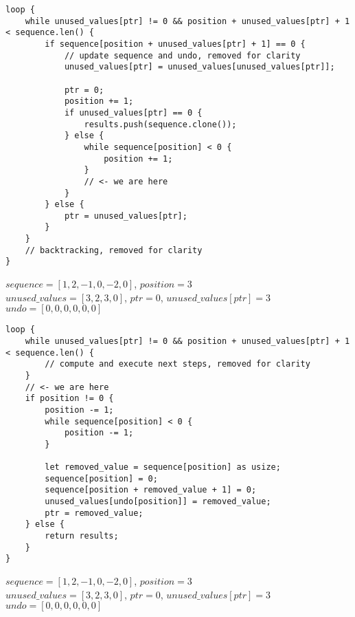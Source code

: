 \begin{frame}[fragile]
    \begin{verbatim}
loop {
    while unused_values[ptr] != 0 && position + unused_values[ptr] + 1 < sequence.len() {
        if sequence[position + unused_values[ptr] + 1] == 0 {
            // update sequence and undo, removed for clarity
            unused_values[ptr] = unused_values[unused_values[ptr]];
            
            ptr = 0;
            position += 1;
            if unused_values[ptr] == 0 {
                results.push(sequence.clone());
            } else {
                while sequence[position] < 0 {
                    position += 1;
                }
                // <- we are here
            }
        } else {
            ptr = unused_values[ptr];
        }
    }
    // backtracking, removed for clarity
}
    \end{verbatim}
    $sequence = [1, 2, -1, 0, -2, 0]$, $position = 3$\\
    $unused\_values = [3, 2, 3, 0]$, $ptr = 0$, $unused\_values[ptr] = 3$\\
    $undo = [0, 0, 0, 0, 0, 0]$
\end{frame}
\begin{frame}[fragile]
    \begin{verbatim}
loop {
    while unused_values[ptr] != 0 && position + unused_values[ptr] + 1 < sequence.len() {
        // compute and execute next steps, removed for clarity
    }
    // <- we are here
    if position != 0 {
        position -= 1;
        while sequence[position] < 0 {
            position -= 1;
        }

        let removed_value = sequence[position] as usize;
        sequence[position] = 0;
        sequence[position + removed_value + 1] = 0;
        unused_values[undo[position]] = removed_value;
        ptr = removed_value;
    } else {
        return results;
    }
}
    \end{verbatim}
    $sequence = [1, 2, -1, 0, -2, 0]$, $position = 3$\\
    $unused\_values = [3, 2, 3, 0]$, $ptr = 0$, $unused\_values[ptr] = 3$\\
    $undo = [0, 0, 0, 0, 0, 0]$
\end{frame}
